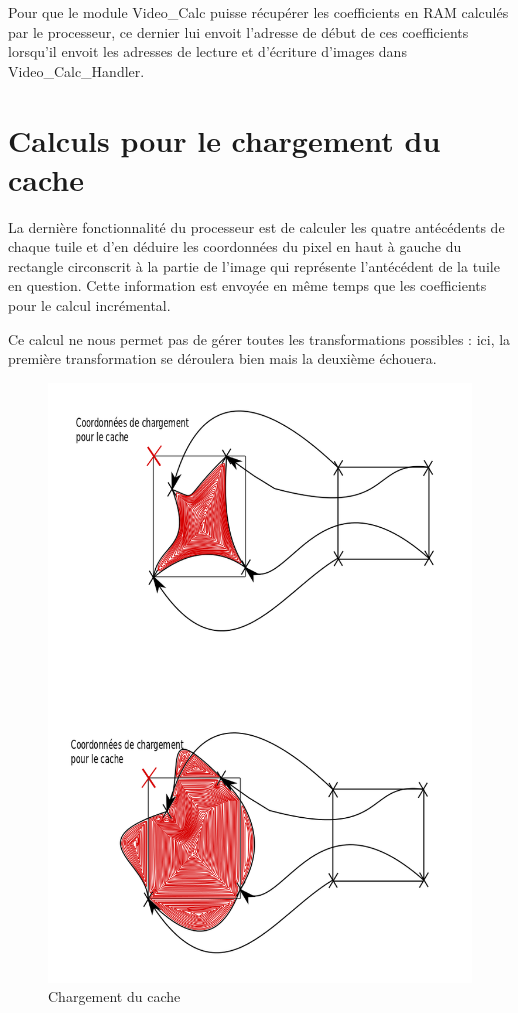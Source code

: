 \documentclass[a4paper,12pt]{report}
\begin{document}
{{{		Pour que le module Video\_Calc puisse récupérer les coefficients en RAM calculés par le processeur, ce dernier lui envoit l'adresse de début de ces coefficients lorsqu'il envoit les adresses de lecture et d'écriture d'images dans Video\_Calc\_Handler.
	 }

	 \section{Calculs pour le chargement du cache}
	 {La dernière fonctionnalité du processeur est de calculer les quatre antécédents de chaque tuile et d'en déduire les coordonnées du pixel en haut à gauche du rectangle circonscrit à la partie de l'image qui représente l'antécédent de la tuile en question.
		Cette information est envoyée en même temps que les coefficients pour le calcul incrémental.

		  Ce calcul ne nous permet pas de gérer toutes les transformations possibles : ici, la première transformation se déroulera bien mais la deuxième échouera.
		  \begin{figure}[!h]
		  \centering
		  \includegraphics[scale = 0.3]{cache_proc.png}
		\caption{Chargement du cache}
		\end{figure}

}}}
\end{document}
